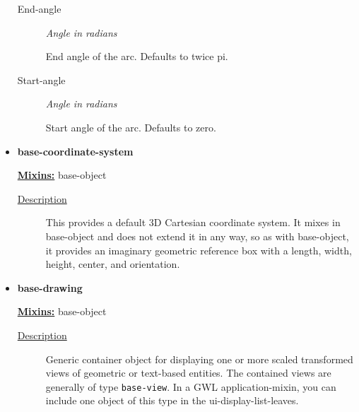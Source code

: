 \documentclass [11pt]{book}
\begin{document}
\begin{itemize}
\begin{description}
\item [End-angle]
\emph{Angle in radians}

 End angle of the arc. Defaults to twice pi.




\item [Start-angle]
\emph{Angle in radians}

 Start angle of the arc. Defaults to zero.




\end{description}







\item {}
\label{prim:base-coordinate-system}
\textbf{base-coordinate-system}


\textbf{
\underline{Mixins:}} base-object





\begin{description}

\item [
\underline{Description}]


This provides a default 3D Cartesian
   coordinate system. It mixes in base-object and does not extend it
   in any way, so as with base-object, it provides an imaginary
   geometric reference box with a length, width, height, center, and
   orientation.



\end{description}









\item {}
\label{prim:base-drawing}
\textbf{base-drawing}


\textbf{
\underline{Mixins:}} base-object





\begin{description}

\item [
\underline{Description}]


Generic container object for displaying one or more scaled
transformed views of geometric or text-based entities. The contained views are generally 
of type \texttt{base-view}. In a GWL application-mixin, you can include one 
object of this type in the ui-display-list-leaves.


\end{description}
\end{itemize}
\end{document}
